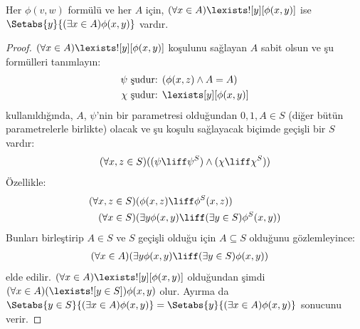 \documentclass[../../../include/open-logic-section]{subfiles}
\begin{document}
\begin{thm}\label{thm:replacement} 
Her $\phi(v,w)$ formülü ve her $A$ için, $(\forall x \in
A)\lexists![y][\phi(x,y)]$ ise $\Setabs{y}{(\exists x \in A)\phi(x,y)}$
vardır.
\end{thm}

\begin{proof}
$(\forall x \in A)\lexists![y][\phi(x,y)]$ koşulunu sağlayan $A$ sabit olsun
ve şu formülleri tanımlayın:
\begin{align*}
	\psi &\text{ şudur: } (\phi(x, z) \land A = A)\\
	\chi &\text{ şudur: } \lexists[y][\phi(x, y)]
\end{align*}
 kullanıldığında, $A$, $\psi$'nin bir parametresi
olduğundan $0, 1, A \in S$ (diğer bütün parametrelerle birlikte) olacak ve
şu koşulu sağlayacak biçimde geçişli bir $S$ vardır:
\[
	(\forall x,z \in S)((\psi \liff \psi^S) \land (\chi \liff \chi^S))
\]
Özellikle:
\begin{align*}
	(\forall  x, z \in S)(&\phi(x, z) \liff \phi^S(x, z))\\
	(\forall x \in S)(&\exists y\phi(x, y) \liff (\exists y \in S)\phi^S(x, y)) 
\end{align*}
Bunları birleştirip $A \in S$ ve $S$ geçişli olduğu için $A \subseteq S$
olduğunu gözlemleyince:
\begin{align*}
	(\forall x \in A)(&\exists y\phi(x, y) \liff (\exists y \in S)\phi(x, y))
\end{align*}
elde edilir. $(\forall x \in A)\lexists![y][\phi(x, y)]$ olduğundan şimdi
$(\forall x \in A)(\lexists![y \in S])\phi(x, y)$ olur. Ayırma da
$\Setabs{y \in S}{(\exists x \in A) \phi(x, y)} =
\Setabs{y}{(\exists x \in A) \phi(x, y)}$ sonucunu verir.
\end{proof}
\end{document}
